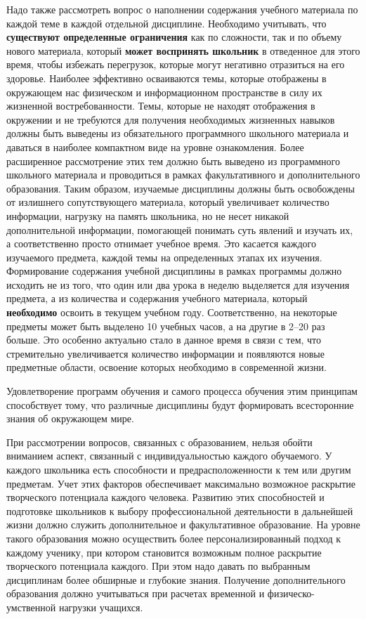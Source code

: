 Надо также рассмотреть вопрос о наполнении содержания учебного материала по каждой теме в каждой отдельной дисциплине. Необходимо учитывать, что \textbf{существуют определенные ограничения} как по сложности, так и по объему нового материала, который \textbf{может воспринять школьник} в отведенное для этого время, чтобы избежать перегрузок, которые могут негативно отразиться на его здоровье. Наиболее эффективно осваиваются темы, которые отображены в окружающем нас физическом и информационном пространстве в силу их жизненной востребованности. Темы, которые не находят отображения в окружении и не требуются для получения необходимых жизненных навыков должны быть выведены из обязательного программного школьного материала и даваться в наиболее компактном виде на уровне ознакомления. Более расширенное рассмотрение этих тем должно быть выведено из программного школьного материала и проводиться в рамках факультативного и дополнительного образования. Таким образом, изучаемые дисциплины должны быть освобождены от излишнего сопутствующего материала, который увеличивает количество информации, нагрузку на память школьника, но не несет никакой дополнительной информации, помогающей понимать суть явлений и изучать их, а соответственно просто отнимает учебное время. Это касается каждого изучаемого предмета, каждой темы на определенных этапах их изучения. Формирование содержания учебной дисциплины в рамках программы должно исходить не из того, что один или два урока в неделю выделяется для изучения предмета, а из количества и содержания учебного материала, который \textbf{необходимо} освоить в текущем учебном году.  Соответственно, на некоторые предметы может быть выделено 10 учебных часов, а на другие в 2--20 раз больше. Это особенно актуально стало в данное время в связи с тем, что стремительно увеличивается количество информации и появляются новые предметные области, освоение которых необходимо в современной жизни.

Удовлетворение программ обучения и самого процесса обучения этим принципам способствует тому, что различные дисциплины будут формировать всесторонние знания об окружающем мире.

При рассмотрении вопросов, связанных с образованием, нельзя обойти вниманием аспект, связанный с индивидуальностью каждого обучаемого. У каждого школьника есть способности и предрасположенности к тем или другим предметам. Учет этих факторов обеспечивает максимально возможное раскрытие творческого потенциала каждого человека. Развитию этих способностей и подготовке школьников к выбору профессиональной деятельности в дальнейшей жизни должно служить дополнительное и факультативное образование. На уровне такого образования можно осуществить более персонализированный подход к каждому ученику, при котором становится возможным полное раскрытие творческого потенциала каждого. При этом надо давать по выбранным дисциплинам более обширные и глубокие знания. Получение дополнительного образования должно учитываться при расчетах временной и физическо-умственной нагрузки учащихся.

